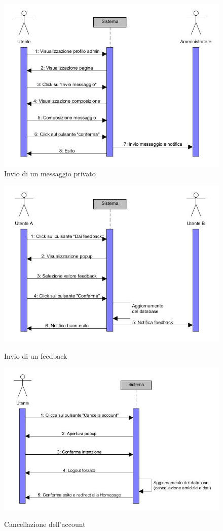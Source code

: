 \documentclass[a4paper,12pt]{article}
\begin{document}
\begin{figure}
\centering
\includegraphics[scale=0.70]{sDiagrams/invioMessaggio.jpg} \\
\caption{\label{invioMessaggio} Invio di un messaggio privato}
\includegraphics[scale=0.70]{sDiagrams/invioFeedback.jpg} \\
\caption{\label{invioFeedback} Invio di un feedback}
\end{figure}
\begin{figure}
\centering
\includegraphics[scale=0.70]{sDiagrams/cancellazioneAccount.jpg} \\
\caption{\label{cancellazioneAccount} Cancellazione dell'account}
\end{figure}
\end{document}
